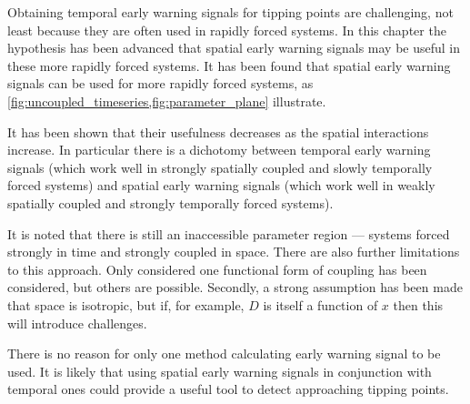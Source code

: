 Obtaining temporal early warning signals for tipping points are challenging, not least because they are often used in rapidly forced systems.
In this chapter the hypothesis has been advanced that spatial early warning signals may be useful in these more rapidly forced systems.
It has been found that spatial early warning signals can be used for more rapidly forced systems, as \cref{fig:uncoupled_timeseries,fig:parameter_plane}
illustrate.

It has been shown that their usefulness decreases as the spatial interactions increase.
In particular there is a dichotomy between temporal early warning signals (which work well in strongly spatially coupled and slowly temporally forced systems)
and spatial early warning signals (which work well in weakly spatially coupled and strongly temporally forced systems).

It is noted that there is still an inaccessible parameter region --- systems forced strongly in time and strongly coupled in space. There are also further limitations
to this approach.  Only considered one functional form of coupling has been considered, but others are possible. Secondly, a strong assumption has been made that space is isotropic,
but if, for example, $D$ is itself a function of $x$ then this will introduce challenges.

There is no reason for only one method calculating early warning signal to be used. It is likely that using spatial early warning signals in conjunction with
temporal ones could provide a useful tool to detect approaching tipping points.